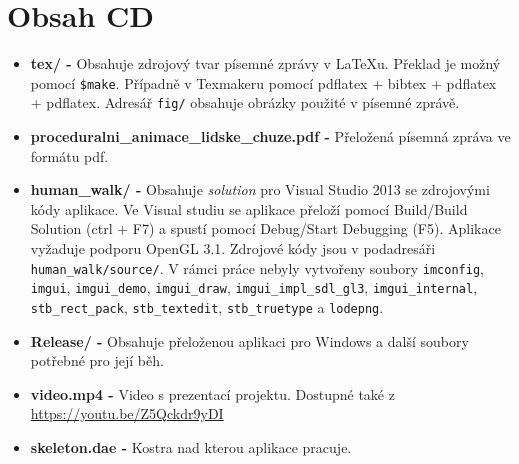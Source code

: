 \chapter{Obsah CD}
\begin{itemize}

\item \textbf{tex/ - } 
Obsahuje zdrojový tvar písemné zprávy v \LaTeX u. Překlad je možný pomocí \texttt{\$make}. Případně v Texmakeru pomocí pdflatex + bibtex + pdflatex + pdflatex. Adresář \texttt{fig/} obsahuje obrázky použité v písemné zprávě.

\item \textbf{proceduralni\_animace\_lidske\_chuze.pdf - }
Přeložená písemná zpráva ve formátu pdf.

\item \textbf{human\_walk/ - }
Obsahuje \textit{solution} pro Visual Studio 2013 se zdrojovými kódy aplikace. Ve Visual studiu se aplikace přeloží pomocí Build/Build Solution (ctrl + F7) a spustí pomocí Debug/Start Debugging (F5). Aplikace vyžaduje podporu OpenGL 3.1. Zdrojové kódy jsou v podadresáři \texttt{human\_walk/source/}. V rámci práce nebyly vytvořeny soubory \texttt{imconfig}, \texttt{imgui}, \texttt{imgui\_demo}, \texttt{imgui\_draw}, \texttt{imgui\_impl\_sdl\_gl3}, \texttt{imgui\_internal}, \texttt{stb\_rect\_pack}, \texttt{stb\_textedit}, \texttt{stb\_truetype} a \texttt{lodepng}.

\item \textbf{Release/ - }
Obsahuje přeloženou aplikaci pro Windows a další soubory potřebné pro její běh.

\item \textbf{video.mp4 - }
Video s prezentací projektu. Dostupné také z \url{https://youtu.be/Z5Qckdr9yDI}

\item \textbf{skeleton.dae - }
Kostra nad kterou aplikace pracuje.

\end{itemize}

